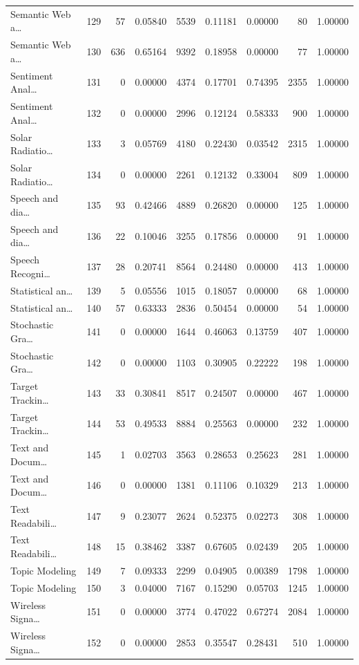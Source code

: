 \begin{table}
\begin{tabular}{lrrrrrrrr}
Semantic Web a… & 129 & 57 & 0.05840 & 5539 & 0.11181 & 0.00000 & 80 & 1.00000 \\
Semantic Web a… & 130 & 636 & 0.65164 & 9392 & 0.18958 & 0.00000 & 77 & 1.00000 \\
Sentiment Anal… & 131 & 0 & 0.00000 & 4374 & 0.17701 & 0.74395 & 2355 & 1.00000 \\
Sentiment Anal… & 132 & 0 & 0.00000 & 2996 & 0.12124 & 0.58333 & 900 & 1.00000 \\
Solar Radiatio… & 133 & 3 & 0.05769 & 4180 & 0.22430 & 0.03542 & 2315 & 1.00000 \\
Solar Radiatio… & 134 & 0 & 0.00000 & 2261 & 0.12132 & 0.33004 & 809 & 1.00000 \\
Speech and dia… & 135 & 93 & 0.42466 & 4889 & 0.26820 & 0.00000 & 125 & 1.00000 \\
Speech and dia… & 136 & 22 & 0.10046 & 3255 & 0.17856 & 0.00000 & 91 & 1.00000 \\
Speech Recogni… & 137 & 28 & 0.20741 & 8564 & 0.24480 & 0.00000 & 413 & 1.00000 \\
Statistical an… & 139 & 5 & 0.05556 & 1015 & 0.18057 & 0.00000 & 68 & 1.00000 \\
Statistical an… & 140 & 57 & 0.63333 & 2836 & 0.50454 & 0.00000 & 54 & 1.00000 \\
Stochastic Gra… & 141 & 0 & 0.00000 & 1644 & 0.46063 & 0.13759 & 407 & 1.00000 \\
Stochastic Gra… & 142 & 0 & 0.00000 & 1103 & 0.30905 & 0.22222 & 198 & 1.00000 \\
Target Trackin… & 143 & 33 & 0.30841 & 8517 & 0.24507 & 0.00000 & 467 & 1.00000 \\
Target Trackin… & 144 & 53 & 0.49533 & 8884 & 0.25563 & 0.00000 & 232 & 1.00000 \\
Text and Docum… & 145 & 1 & 0.02703 & 3563 & 0.28653 & 0.25623 & 281 & 1.00000 \\
Text and Docum… & 146 & 0 & 0.00000 & 1381 & 0.11106 & 0.10329 & 213 & 1.00000 \\
Text Readabili… & 147 & 9 & 0.23077 & 2624 & 0.52375 & 0.02273 & 308 & 1.00000 \\
Text Readabili… & 148 & 15 & 0.38462 & 3387 & 0.67605 & 0.02439 & 205 & 1.00000 \\
Topic Modeling & 149 & 7 & 0.09333 & 2299 & 0.04905 & 0.00389 & 1798 & 1.00000 \\
Topic Modeling & 150 & 3 & 0.04000 & 7167 & 0.15290 & 0.05703 & 1245 & 1.00000 \\
Wireless Signa… & 151 & 0 & 0.00000 & 3774 & 0.47022 & 0.67274 & 2084 & 1.00000 \\
Wireless Signa… & 152 & 0 & 0.00000 & 2853 & 0.35547 & 0.28431 & 510 & 1.00000 \\
\bottomrule
\end{tabular}
\end{table}
